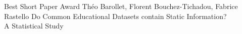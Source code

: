 \documentclass[a4paper,landscape]{article} %
\begin{document}
\diploma
    {Best Short Paper Award}
    {Théo Barollet, Florent Bouchez-Tichadou, Fabrice Rastello}
    {Do Common Educational Datasets contain Static Information?\\ A Statistical Study}
\hfill
\end{document}
